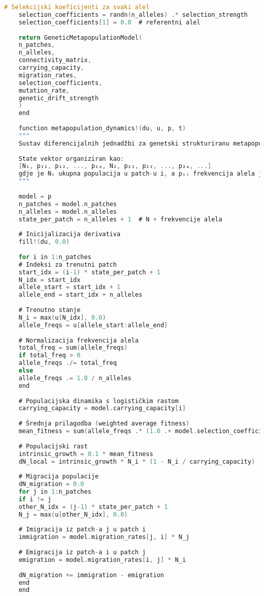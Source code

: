 \documentclass[11pt,oneside]{book}
\begin{document}
\begin{lstlisting}[language=C, caption=Julia implementacija genetski strukturiranog metapopulacijskog modela]
	# Selekcijski koeficijenti za svaki alel
	selection_coefficients = randn(n_alleles) .* selection_strength
	selection_coefficients[1] = 0.0  # referentni alel
	
	return GeneticMetapopulationModel(
	n_patches,
	n_alleles,
	connectivity_matrix,
	carrying_capacity,
	migration_rates,
	selection_coefficients,
	mutation_rate,
	genetic_drift_strength
	)
	end
	
	function metapopulation_dynamics!(du, u, p, t)
	"""
	Sustav diferencijalnih jednadžbi za genetski strukturiranu metapopulaciju
	
	State vektor organiziran kao:
	[N₁, p₁₁, p₁₂, ..., p₁ₐ, N₂, p₂₁, p₂₂, ..., p₂ₐ, ...]
	gdje je Nᵢ ukupna populacija u patch-u i, a pᵢⱼ frekvencija alela j u patch-u i
	"""
	
	model = p
	n_patches = model.n_patches
	n_alleles = model.n_alleles
	state_per_patch = n_alleles + 1  # N + frekvencije alela
	
	# Inicijalizacija derivativa
	fill!(du, 0.0)
	
	for i in 1:n_patches
	# Indeksi za trenutni patch
	start_idx = (i-1) * state_per_patch + 1
	N_idx = start_idx
	allele_start = start_idx + 1
	allele_end = start_idx + n_alleles
	
	# Trenutno stanje
	N_i = max(u[N_idx], 0.0)
	allele_freqs = u[allele_start:allele_end]
	
	# Normalizacija frekvencija alela
	total_freq = sum(allele_freqs)
	if total_freq > 0
	allele_freqs ./= total_freq
	else
	allele_freqs .= 1.0 / n_alleles
	end
	
	# Populacijska dinamika s logističkim rastom
	carrying_capacity = model.carrying_capacity[i]
	
	# Średnja prilagodba (weighted average fitness)
	mean_fitness = sum(allele_freqs .* (1.0 .+ model.selection_coefficients))
	
	# Populacijski rast
	intrinsic_growth = 0.1 * mean_fitness
	dN_local = intrinsic_growth * N_i * (1 - N_i / carrying_capacity)
	
	# Migracija populacije
	dN_migration = 0.0
	for j in 1:n_patches
	if i != j
	other_N_idx = (j-1) * state_per_patch + 1
	N_j = max(u[other_N_idx], 0.0)
	
	# Imigracija iz patch-a j u patch i
	immigration = model.migration_rates[j, i] * N_j
	
	# Emigracija iz patch-a i u patch j
	emigration = model.migration_rates[i, j] * N_i
	
	dN_migration += immigration - emigration
	end
	end
	

\end{lstlisting}
\end{document}
